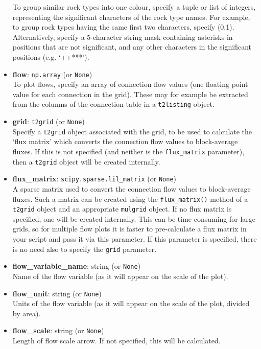 \begin{itemize}
  To group similar rock types into one colour, specify a tuple or list of integers, representing the significant characters of the rock type names.  For example, to group rock types having the same first two characters, specify (0,1).  Alternatively, specify a 5-character string mask containing asterisks in positions that are not significant, and any other characters in the significant positions (e.g. `++***').
\item \textbf{flow}: \texttt{np.array} (or \texttt{None})\\
  To plot flows, specify an array of connection flow values (one floating point value for each connection in the grid).  These may for example be extracted from the columns of the connection table in a \texttt{t2listing} object.
\item \textbf{grid}: \texttt{t2grid} (or \texttt{None})\\
  Specify a \texttt{t2grid} object associated with the grid, to be used to calculate the `flux matrix' which converts the connection flow values to block-average fluxes.  If this is not specified (and neither is the \texttt{flux\_matrix} parameter), then a \texttt{t2grid} object will be created internally.
\item \textbf{flux\_matrix}: \texttt{scipy.sparse.lil\_matrix} (or \texttt{None})\\
  A sparse matrix used to convert the connection flow values to block-average fluxes.  Such a matrix can be created using the \texttt{flux\_matrix()} method of a \texttt{t2grid} object and an appropriate \texttt{mulgrid} object.  If no flux matrix is specified, one will be created internally.  This can be time-consuming for large grids, so for multiple flow plots it is faster to pre-calculate a flux matrix in your script and pass it via this parameter.  If this parameter is specified, there is no need also to specify the \texttt{grid} parameter.
\item \textbf{flow\_variable\_name}: string (or \texttt{None})\\
  Name of the flow variable (as it will appear on the scale of the plot).
\item \textbf{flow\_unit}: string (or \texttt{None})\\
  Units of the flow variable (as it will appear on the scale of the plot, divided by area).
\item \textbf{flow\_scale}: string (or \texttt{None})\\
  Length of flow scale arrow.  If not specified, this will be calculated.

\end{itemize}
